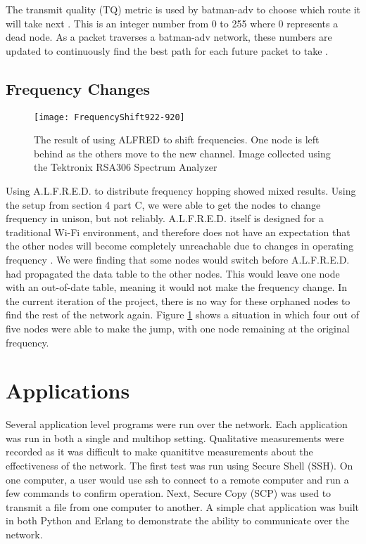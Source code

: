 The transmit quality (TQ) metric is used by batman-adv to choose which route it will take next \cite{0037}. This is an integer number from 0 to 255 where 0 represents a dead node. As a packet traverses a batman-adv network, these numbers are updated to continuously find the best path for each future packet to take \cite{0037}.



\subsection{Frequency Changes}

\begin{figure}
	\centering
	\texttt{[image: FrequencyShift922-920]}
	\caption{The result of using ALFRED to shift frequencies. One node is left behind as the others move to the new channel. Image collected using the Tektronix RSA306 Spectrum Analyzer}
	\label{fig:freqshift}
\end{figure}


Using A.L.F.R.E.D. to distribute frequency hopping showed mixed results. Using the setup from section 4 part C, we were able to get the nodes to change frequency in unison, but not reliably. A.L.F.R.E.D. itself is designed for a traditional Wi-Fi environment, and therefore does not have an expectation that the other nodes will become completely unreachable due to changes in operating frequency \cite{0015}. We were finding that some nodes would switch before A.L.F.R.E.D. had propagated the data table to the other nodes. This would leave one node with an out-of-date table, meaning it would not make the frequency change. In the current iteration of the project, there is no way for these orphaned nodes to find the rest of the network again. Figure \ref{fig:freqshift} shows a situation in which four out of five nodes were able to make the jump, with one node remaining at the original frequency.

\section{Applications}


Several application level programs were run over the network. Each application was run in both a single and multihop setting. Qualitative measurements were recorded as it was difficult to make quanititve measurements about the effectiveness of the network. The first test was run using Secure Shell (SSH). On one computer, a user would use ssh to connect to a remote computer and run a few commands to confirm operation. Next, Secure Copy (SCP) was used to transmit a file from one computer to another. A simple chat application was built in both Python and Erlang to demonstrate the ability to communicate over the network. 



